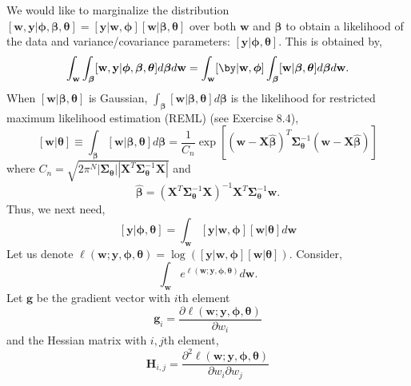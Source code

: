 \documentclass[12pt, titlepage]{article}
\begin{document}
We would like to marginalize the distribution $[\mathbf{w}, \mathbf{y}|\boldsymbol{\phi},\boldsymbol{\beta},\boldsymbol{\theta}] = [\mathbf{y}|\mathbf{w},\boldsymbol{\phi}][\mathbf{w}|\boldsymbol{\beta},\boldsymbol{\theta}]$ over both $\mathbf{w}$ and $\boldsymbol{\beta}$ to obtain a likelihood of the data and variance/covariance parameters: $[\mathbf{y}|\boldsymbol{\phi},\boldsymbol{\theta}]$.  This is obtained by,
$$
	\int_\mathbf{w} \int_{\boldsymbol{\beta}} [\mathbf{w}, \mathbf{y}|\boldsymbol{\phi},\boldsymbol{\beta},\boldsymbol{\theta}] d\boldsymbol{\beta} d\mathbf{w} =
		\int_\mathbf{w}  [\by|\mathbf{w},\boldsymbol{\phi}] \int_{\boldsymbol{\beta}} [\mathbf{w}|\boldsymbol{\beta},\boldsymbol{\theta}] d\boldsymbol{\beta} d\mathbf{w}.
$$
When $[\mathbf{w}|\boldsymbol{\beta},\boldsymbol{\theta}]$ is Gaussian, $\int_{\boldsymbol{\beta}} [\mathbf{w}|\boldsymbol{\beta},\boldsymbol{\theta}] d\boldsymbol{\beta}$ is the likelihood for restricted maximum likelihood estimation (REML) (see Exercise 8.4),
$$
[\mathbf{w}|\boldsymbol{\theta}] \equiv \int_{\boldsymbol{\beta}} [\mathbf{w}|\boldsymbol{\beta},\boldsymbol{\theta}] d\boldsymbol{\beta} = 
\frac{1}{C_n}\exp[(\mathbf{w} - \mathbf{X}\hat{\boldsymbol{\beta}})^{T}\boldsymbol{\Sigma}_{\boldsymbol{\theta}}^{-1}(\mathbf{w} - \mathbf{X}\hat{\boldsymbol{\beta}})]
$$
where $C_n = \sqrt{2\pi^N|\boldsymbol{\Sigma}_{\boldsymbol{\theta}}||\mathbf{X}^{T}\boldsymbol{\Sigma}_{\boldsymbol{\theta}}^{-1}\mathbf{X}|}$ and 
\begin{equation} \label{eq:betaHat}
  \hat{\boldsymbol{\beta}} = (\mathbf{X}^{T}\boldsymbol{\Sigma}_{\boldsymbol{\theta}}^{-1}\mathbf{X})^{-1}\mathbf{X}^{T}\boldsymbol{\Sigma}_{\boldsymbol{\theta}}^{-1}\mathbf{w}.
\end{equation}
Thus, we next need,
$$
	[\mathbf{y}| \boldsymbol{\phi},\boldsymbol{\theta}] = \int_\mathbf{w}  [\mathbf{y}|\mathbf{w},\boldsymbol{\phi}][\mathbf{w}|\boldsymbol{\theta}]d\mathbf{w}
$$
Let us denote $\ell(\mathbf{w};\mathbf{y},\boldsymbol{\phi},\boldsymbol{\theta}) = \log([\mathbf{y}|\mathbf{w},\boldsymbol{\phi}][\mathbf{w}|\boldsymbol{\theta}])$.  Consider,
$$
\int_\mathbf{w} e^{\ell(\mathbf{w};\mathbf{y},\boldsymbol{\phi},\boldsymbol{\theta})} d\mathbf{w}.
$$
Let $\mathbf{g}$ be the gradient vector with $i$th element
$$
\mathbf{g}_{i} = \frac{\partial \ell(\mathbf{w};\mathbf{y},\boldsymbol{\phi},\boldsymbol{\theta})}{\partial w_i}
$$
and the Hessian matrix with $i,j$th element,
$$
\mathbf{H}_{i,j} = \frac{\partial^2 \ell(\mathbf{w};\mathbf{y},\boldsymbol{\phi},\boldsymbol{\theta})}{\partial w_i\partial w_j}
$$
\end{document}
